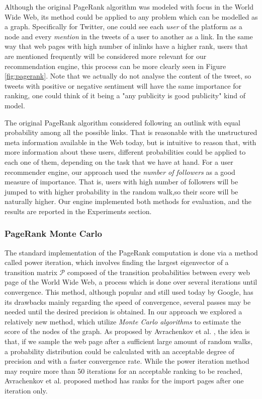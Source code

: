 Although the original PageRank algorithm was modeled with focus in the World Wide Web, its method could be applied to any problem which can be modelled as a graph. Specifically for Twitter, one could see each \emph{user} of the platform as a node and every \emph{mention} in the tweets of a user to another as a link. In the same way that web pages with high number of inlinks have a higher rank, users that are mentioned frequently will be considered more relevant for our recommendation engine, this process can be more clearly seen in Figure \ref{fig:pagerank}. Note that we actually do not analyse the content of the tweet, so tweets with positive or negative sentiment will have the same importance for ranking, one could think of it being a "any publicity is good publicity" kind of model. 

The original PageRank algorithm considered following an outlink with equal probability among all the possible links. That is reasonable with the unstructured meta information available in the Web today, but is intuitive to reason that, with more information about these users, different probabilities could be applied to each one of them, depending on the task that we have at hand. For a user recommender engine, our approach used the \emph{number of followers} as a good measure of importance. That is, users with high number of followers will be jumped to with higher probability in the random walk,so their score will be naturally higher. Our engine implemented both methods for evaluation, and the results are reported in the Experiments section.

\subsubsection{PageRank Monte Carlo}

The standard implementation of the PageRank computation is done via a method called power iteration, which involves finding the largest eigenvector of a transition matrix $\mathcal{P}$ composed of the transition probabilities between every web page of the World Wide Web, a process which is done over several iterations until convergence. This method, although popular and still used today by Google, has its drawbacks mainly regarding the speed of convergence, several passes may be needed until the desired precision is obtained. In our approach we explored a relatively new method, which utilize \emph{Monte Carlo algorithms} to estimate the score of the nodes of the graph. As proposed by Avrachenkov et al. \cite{prmc}, the idea is that, if we sample the web page after a sufficient large amount of random walks, a probability distribution could be calculated with an acceptable degree of precision and with a faster convergence rate. While the power iteration method may require more than 50 iterations for an acceptable ranking to be reached, Avrachenkov et al. proposed method has ranks for the import pages after one iteration only.

